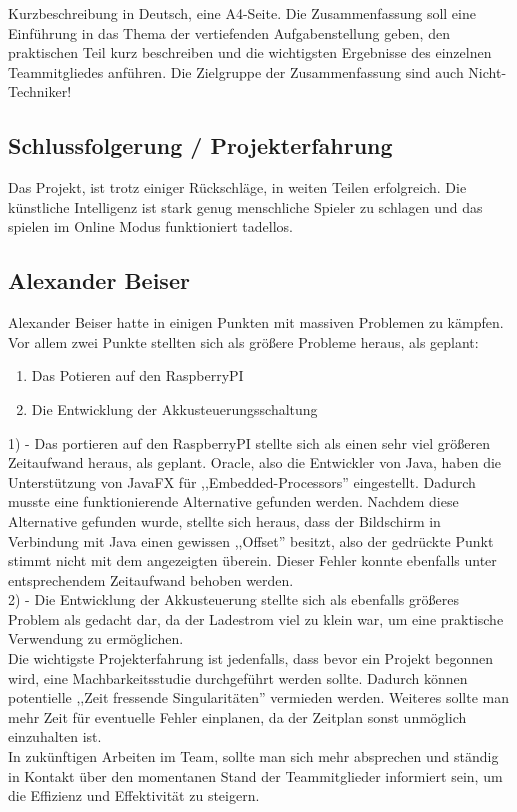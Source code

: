 \documentclass[12pt,a4paper]{article}
\newcommand{\yhbu}[0]{\color{ydkbu}}	%
\begin{document}
{	{\yhbu
	Kurzbeschreibung in Deutsch, eine A4-Seite.
	Die Zusammenfassung soll eine Einführung in das Thema
	der vertiefenden Aufgabenstellung geben,
	den praktischen Teil kurz beschreiben und die wichtigsten Ergebnisse
	des einzelnen Teammitgliedes anführen.
	Die Zielgruppe der Zusammenfassung sind auch Nicht-Techniker!
	}

\newpage
 \subsection{Schlussfolgerung / Projekterfahrung}
 
 Das Projekt, ist trotz einiger Rückschläge, in weiten Teilen erfolgreich. Die künstliche Intelligenz ist stark genug menschliche Spieler zu schlagen und das spielen im Online Modus funktioniert tadellos. \\
 
 \subsection{Alexander Beiser}
 
	Alexander Beiser hatte in einigen Punkten mit massiven Problemen zu kämpfen. Vor allem zwei Punkte stellten sich als größere Probleme heraus, als geplant:
\begin{enumerate}
	\item{Das Potieren auf den RaspberryPI}
	\item{Die Entwicklung der Akkusteuerungsschaltung}
\end{enumerate}
1) - Das portieren auf den RaspberryPI stellte sich als einen sehr viel größeren Zeitaufwand heraus, als geplant. Oracle, also die Entwickler von Java, haben die Unterstützung von JavaFX für ,,Embedded-Processors'' eingestellt. Dadurch musste eine funktionierende Alternative gefunden werden. Nachdem diese Alternative gefunden wurde, stellte sich heraus, dass der Bildschirm in Verbindung mit Java einen gewissen ,,Offset'' besitzt, also der gedrückte Punkt stimmt nicht mit dem angezeigten überein. Dieser Fehler konnte ebenfalls unter entsprechendem Zeitaufwand behoben werden. \\[1ex]
2) - Die Entwicklung der Akkusteuerung stellte sich als ebenfalls größeres Problem als gedacht dar, da der Ladestrom viel zu klein war, um eine praktische Verwendung zu ermöglichen. \\[2ex]
Die wichtigste Projekterfahrung ist jedenfalls, dass bevor ein Projekt begonnen wird, eine Machbarkeitsstudie durchgeführt werden sollte. Dadurch können potentielle ,,Zeit fressende Singularitäten'' vermieden werden. Weiteres sollte man mehr Zeit für eventuelle Fehler einplanen, da der Zeitplan sonst unmöglich einzuhalten ist. \\
In zukünftigen Arbeiten im Team, sollte man sich mehr absprechen und ständig in Kontakt über den momentanen Stand der Teammitglieder informiert sein, um die Effizienz und Effektivität zu steigern.
 
}
\end{document}
